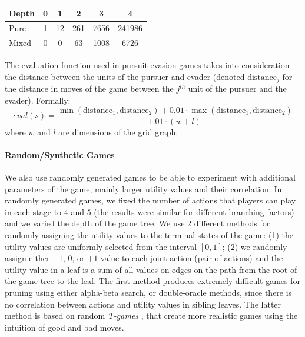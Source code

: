 \vspace{0.1cm}

\begin{center}
\small
\begin{tabular}{|l|c|c|c|c|c|}
\hline Depth & 0 & 1 & 2 & 3 & 4 \\
\hline Pure  & 1 & 12 & 261 & 7656 & 241986 \\
\hline Mixed & 0 & 0 & 63 & 1008 & 6726 \\
\hline
\end{tabular}
\end{center}

\vspace{0.1cm}

The evaluation function used in pursuit-evasion games takes into consideration the distance between the units of the pursuer and evader (denoted $\textrm{distance}_j$ for the distance in moves of the game between the $j^{th}$ unit of the pursuer and the evader). Formally:
$$
eval(s) = \frac{\min(\textrm{distance}_1,\textrm{distance}_2) + 0.01\cdot\max(\textrm{distance}_1,\textrm{distance}_2)}{1.01 \cdot (w+l)}
$$
where $w$ and $l$ are dimensions of the grid graph.

\paragraph{\textbf{Random/Synthetic Games}}
We also use randomly generated games to be able to experiment with additional parameters of the game, mainly larger utility values and their correlation.
In randomly generated games, we fixed the number of actions that players can play in each stage to $4$ and $5$ (the results were similar for different branching factors) and we varied the depth of the game tree. 
We use $2$ different methods for randomly assigning the utility values to the terminal states of the game: 
(1) the utility values are uniformly selected from the interval $\left[0,1\right]$; 
(2) we randomly assign either $-1$, $0$, or $+1$ value to each joint action (pair of actions) and the utility value in a leaf is a sum of all values on edges on the path from the root of the game tree to the leaf. 
The first method produces extremely difficult games for pruning using either alpha-beta search, or double-oracle methods, since there is no correlation between actions and utility values in sibling leaves. 
The latter method is based on random \emph{T-games} \cite{smith1995}, that create more realistic games using the intuition of good and bad moves.

